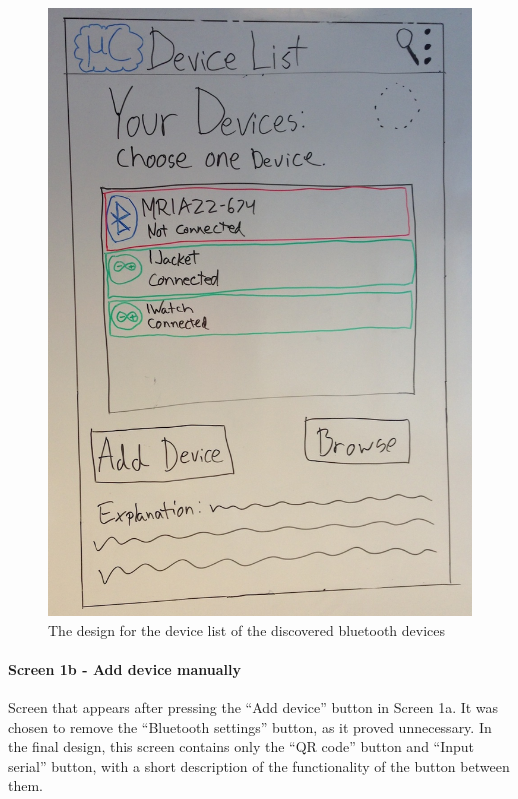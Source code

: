 \begin{figure}[H]
	\centering
		\includegraphics[scale=0.2]{images/Design_guide/Screen1a.png}
	\caption[Screen 1a - Device list]{The design for the device list of the discovered bluetooth devices}
	\label{fig:screen1a}
\end{figure}


\paragraph{Screen 1b - Add device manually}
Screen that appears after pressing the ``Add device'' button in Screen 1a. It was chosen to remove the ``Bluetooth settings'' button, as it proved unnecessary. In the final design, this screen contains only the ``QR code'' button and ``Input serial'' button, with a short description of the functionality of the button between them.

